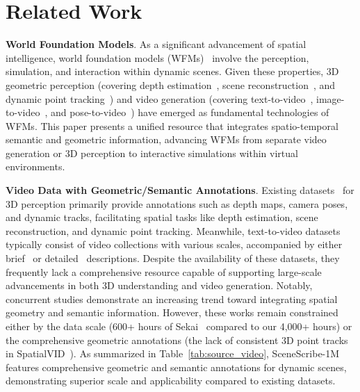 \section{Related Work}
\label{sec:formatting}



\textbf{World Foundation Models}.
As a significant advancement of spatial intelligence, world foundation models (WFMs)~\cite{brooks2024video,deepmind_genie3_2024,ali2025world,meng2024towards,kang2024far} involve the perception, simulation, and interaction within dynamic scenes. Given these properties, 3D geometric perception (covering depth estimation~\cite{piccinelli2024unidepth,yang2024depth,wang2025moge}, scene reconstruction~\cite{wang2025vggt,zhang2024monst3r, wang2025continuous, zhang2025flare,li2025megasam}, and dynamic point tracking~\cite{karaev2025cotracker3,xiao2024spatialtracker,xiao2025spatialtrackerv2}) and video generation (covering text-to-video~\cite{kong2024hunyuanvideo,wang2024scene,hong2022cogvideo,wan2025}, image-to-video~\cite{blattmann2023stable,xing2024dynamicrafter,xu2024easyanimate}, and pose-to-video~\cite{bahmani2025ac3d,he2024cameractrl,bai2025recammaster,bai2024syncammaster}) have emerged as fundamental technologies of WFMs.
This paper presents a unified resource that integrates spatio-temporal semantic and geometric information, advancing WFMs from separate video generation or 3D perception to interactive simulations within virtual environments.



\noindent\textbf{Video Data with Geometric/Semantic Annotations}.
Existing datasets~\cite{yao2020blendedmvs,cabon2020virtual,zhou2018stereo,bai2024syncammaster, zhao2024genxd, rockwell2025dynamic} for 3D perception primarily provide annotations such as depth maps, camera poses, and dynamic tracks, facilitating spatial tasks like depth estimation, scene reconstruction, and dynamic point tracking.
Meanwhile, text-to-video datasets typically consist of video collections with various scales, accompanied by either brief~\cite{soomro2012ucf101,xu_2016_CVPR,zhu2022celebv,yuan2024chronomagic} or detailed~\cite{xue2022advancing,chen2024panda,wang2025koala,nan2024openvid} descriptions.
Despite the availability of these datasets, they frequently lack a comprehensive resource capable of supporting large-scale advancements in both 3D understanding and video generation.
Notably, concurrent studies demonstrate an increasing trend toward integrating spatial geometry and semantic information. However, these works remain constrained either by the data scale (600+ hours of Sekai~\cite{li2025sekai} compared to our 4,000+ hours) or the comprehensive geometric annotations (the lack of consistent 3D point tracks in SpatialVID~\cite{wang2025spatialvid}). As summarized in Table~\ref{tab:source_video}, SceneScribe-1M features comprehensive geometric and semantic annotations for dynamic scenes, demonstrating superior scale and applicability compared to existing datasets.



